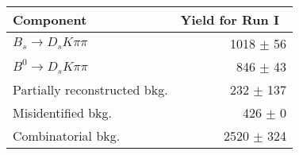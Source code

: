  \begin{tabular}{l r }
\hline\hline
Component & Yield for Run I\ \\
\hline
$B_s \to D_s K \pi \pi$ & 1018 $\pm$ 56 \\
$B^{0} \to D_s K \pi \pi$ & 846 $\pm$ 43 \\
Partially reconstructed bkg. & 232 $\pm$ 137 \\
Misidentified bkg. & 426 $\pm$ 0 \\
Combinatorial bkg. & 2520 $\pm$ 324 \\
\hline\hline
\end{tabular}
\label{table:signalYields_run1}
